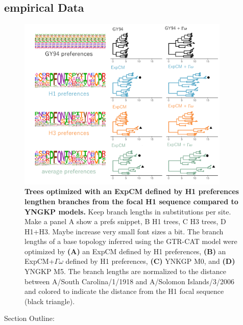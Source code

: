 \documentclass[11pt]{article}
\newcommand\skhcomment[1]{{\color{cyan}#1}}
\newcommand\jdbcomment[1]{{\color{red}#1}}
\begin{document}
\subsection*{empirical Data}

\begin{figure}[H]
\centerline{\includegraphics[width=0.9\textwidth]{figures/empirical_trees}}
\caption{\label{fig:empirical_trees}
\textbf{Trees optimized with an ExpCM defined by H1 preferences lengthen branches from the focal H1 sequence compared to YNGKP models.} 
\jdbcomment{Keep branch lengths in substitutions per site. Make a panel A show a prefs snippet, B H1 trees, C H3 trees, D H1+H3. Maybe increase very small font sizes a bit.}
The branch lengths of a base topology inferred using the GTR-CAT model were optimized by \textbf{(A)} an ExpCM defined by H1 preferences, \textbf{(B)} an ExpCM+$\Gamma\omega$ defined by H1 preferences, \textbf{(C)} YNKGP M0, and \textbf{(D)} YNGKP M5.
The branch lengths are normalized to the distance between A/South Carolina/1/1918 and A/Solomon Islands/3/2006 and colored to indicate the distance from the H1 focal sequence (black triangle).
}
\end{figure}


\skhcomment{Section Outline:}
\end{document}
